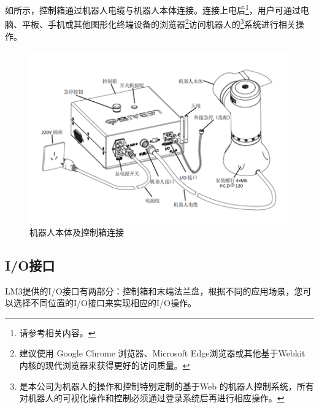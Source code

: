 \clearpage

如所示，控制箱通过机器人电缆与机器人本体连接。连接上电后\footnote{请参考相关内容。}，用户可通过电脑、平板、手机或其他图形化终端设备的浏览器\footnote{建议使用 Google Chrome 浏览器、Microsoft Edge浏览器或其他基于Webkit 内核的现代浏览器来获得更好的访问质量。 }访问机器人的\LM\footnote{\LM 是本公司为机器人的操作和控制特别定制的基于Web 的机器人控制系统，所有对机器人的可视化操作和控制必须通过登录\LM 系统后再进行相应操作。}系统进行相关操作。

\begin{figure}[ht]
    \centering
    \includegraphics{image/1-2-host.png}
    \caption{机器人本体及控制箱连接}
    \label{fig:机器人本体及控制箱连接}
\end{figure}

\subsection{I/O接口}

LM3提供的I/O接口有两部分：控制箱和末端法兰盘，根据不同的应用场景，您可以选择不同位置的I/O接口来实现相应的I/O操作。

